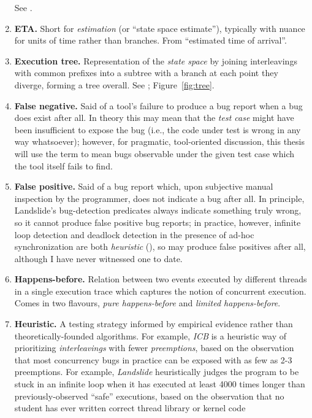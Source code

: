 \begin{enumerate}
		See \sect{\ref{sec:landslide-estimate}}.
	\item {\bf ETA.}
		Short for {\em estimation} (or ``state space estimate''),
		typically with nuance for units of time rather than branches.
		From ``estimated time of arrival''.
	\item {\bf Execution tree.}
		Representation of the {\em state space} by joining interleavings with common prefixes
		into a subtree with a branch at each point they diverge, forming a tree overall.
		See \sect{\ref{sec:overview-statespace}}; Figure~\ref{fig:tree}.
	\item {\bf False negative.}
		Said of a tool's failure to produce a bug report when a bug does exist after all.
		In theory this may mean that the {\em test case} might have been insufficient to expose the bug
		(i.e., the code under test is wrong in any way whatsoever);
		however, for pragmatic, tool-oriented discussion,
		this thesis will use the term to mean bugs observable under the given test case which the tool itself fails to find.
	\item {\bf False positive.}
		Said of a bug report which,
		upon subjective manual inspection by the programmer,
		does not indicate a bug after all.
		In principle, Landslide's bug-detection predicates always indicate something truly wrong,
		so it cannot produce false positive bug reports;
		in practice, however, infinite loop detection and deadlock detection in the presence of ad-hoc synchronization
		are both {\em heuristic} (\sect{\ref{sec:landslide-blocking}}),
		so may produce false positives after all, although I have never witnessed one to date.
	\item {\bf Happens-before.}
		Relation between two events executed by different threads in a single execution trace
		which captures the notion of concurrent execution.
		Comes in two flavours, {\em pure happens-before} and {\em limited happens-before}.
	\item {\bf Heuristic.}
		A testing strategy informed by empirical evidence rather than theoretically-founded algorithms.
		For example, {\em ICB} is a heuristic way of prioritizing {\em interleavings} with fewer {\em preemptions},
		based on the observation that most concurrency bugs in practice can be exposed with as few as 2-3 preemptions.
		For example, {\em Landslide} heuristically judges the program to be stuck in an infinite loop
		when it has executed at least 4000 times longer than previously-observed ``safe'' executions,
		based on the observation that no student has ever written correct thread library or kernel code

\end{enumerate}
